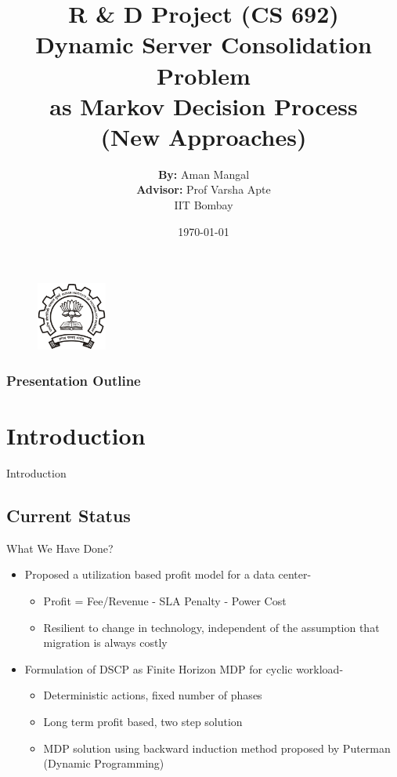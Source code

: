 \documentclass{beamer}
\title[Dynamic Server Consolidation (simcon)]
{
	R \& D Project (CS 692) \\
	Dynamic Server Consolidation Problem \\
	as Markov Decision Process \\
	(New Approaches)
}
\author[Aman Mangal, (IIT Bombay)]
{	\sffamily
	\textbf{By:} Aman Mangal \\
	\textbf{Advisor:} Prof Varsha Apte \\
	IIT Bombay
}
\date{\today}
\begin{document}
\begin{frame}
\addtocounter{framenumber}{-1}
\begin{figure}
    \includegraphics[width=2.3cm]{images/iitb}
\end{figure}
\titlepage
\end{frame}

\begin{frame}\frametitle{Presentation Outline}
\tableofcontents
\end{frame}

\section{Introduction}
\begin{frame}{Introduction}
\addtocounter{framenumber}{-1}
\tableofcontents[currentsection]
\end{frame}

\subsection{Current Status}
\begin{frame}{What We Have Done?}
\begin{itemize}
\item Proposed a utilization based profit model for a data center-
\begin{itemize}
\item Profit = Fee/Revenue - SLA Penalty - Power Cost
\item Resilient to change in technology, independent of the assumption that migration is always costly
\end{itemize}
\item Formulation of DSCP as Finite Horizon MDP for cyclic workload-
\begin{itemize}
\item Deterministic actions, fixed number of phases
\item Long term profit based, two step solution
\item MDP solution using backward induction method proposed by Puterman (Dynamic Programming)
\end{itemize}
\end{itemize}
\end{frame}
\end{document}
